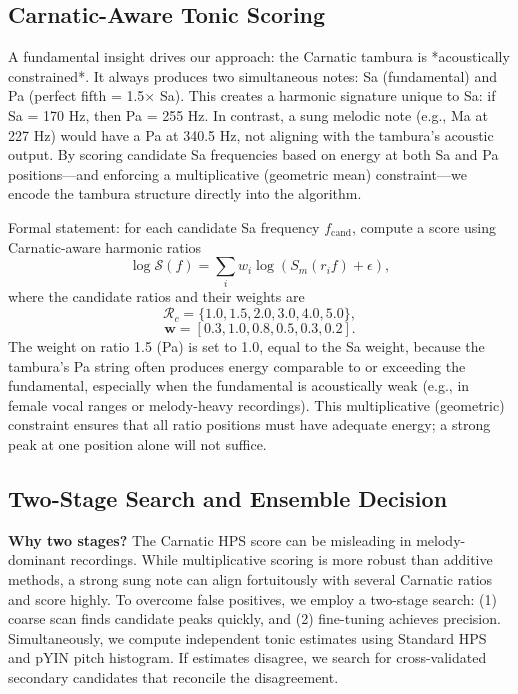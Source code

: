 \documentclass{ieeeaccess}
\begin{document}
\subsection{Carnatic-Aware Tonic Scoring}
A fundamental insight drives our approach: the Carnatic tambura is *acoustically constrained*. It always produces two simultaneous notes: Sa (fundamental) and Pa (perfect fifth = 1.5× Sa). This creates a harmonic signature unique to Sa: if Sa = 170 Hz, then Pa = 255 Hz. In contrast, a sung melodic note (e.g., Ma at 227 Hz) would have a Pa at 340.5 Hz, not aligning with the tambura's acoustic output. By scoring candidate Sa frequencies based on energy at both Sa and Pa positions—and enforcing a multiplicative (geometric mean) constraint—we encode the tambura structure directly into the algorithm.

Formal statement: for each candidate Sa frequency $f_{\text{cand}}$, compute a score using Carnatic-aware harmonic ratios
\begin{equation}
\log\mathcal{S}(f)=\sum_i w_i\log\left(S_m(r_i f)+\epsilon\right),
\end{equation}
where the candidate ratios and their weights are
\begin{equation}
\mathcal{R}_{c}=\{1.0,1.5,2.0,3.0,4.0,5.0\},
\end{equation}
\begin{equation}
\mathbf{w}=[0.3,1.0,0.8,0.5,0.3,0.2].
\end{equation}
The weight on ratio 1.5 (Pa) is set to 1.0, equal to the Sa weight, because the tambura's Pa string often produces energy comparable to or exceeding the fundamental, especially when the fundamental is acoustically weak (e.g., in female vocal ranges or melody-heavy recordings). This multiplicative (geometric) constraint ensures that all ratio positions must have adequate energy; a strong peak at one position alone will not suffice.

\subsection{Two-Stage Search and Ensemble Decision}
\textbf{Why two stages?} The Carnatic HPS score can be misleading in melody-dominant recordings. While multiplicative scoring is more robust than additive methods, a strong sung note can align fortuitously with several Carnatic ratios and score highly. To overcome false positives, we employ a two-stage search: (1) coarse scan finds candidate peaks quickly, and (2) fine-tuning achieves precision. Simultaneously, we compute independent tonic estimates using Standard HPS and pYIN pitch histogram. If estimates disagree, we search for cross-validated secondary candidates that reconcile the disagreement.
\end{document}

